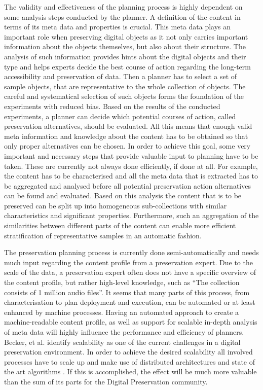 The validity and effectiveness of the planning process is highly dependent on some analysis steps conducted by the planner.
A definition of the content in terms of its meta data and properties is crucial.
This meta data plays an important role when preserving digital objects as it not only carries important information about the objects themselves, but also about their structure.
The analysis of such information provides hints about the digital objects and their type and helps experts decide the best course of action regarding the long-term accessibility and preservation of data.
Then a planner has to select a set of sample objects, that are representative to the whole collection of objects.
The careful and systematical selection of such objects forms the foundation of the experiments with reduced bias.
Based on the results of the conducted experiments, a planner can decide which potential courses of action, called preservation alternatives, should be evaluated.
All this means that enough valid meta information and knowledge about the content has to be obtained so that only proper alternatives can be chosen.
In order to achieve this goal, some very important and necessary steps that provide valuable input to planning have to be taken.
These are currently not always done efficiently, if done at all. 
For example, the content has to be characterised and all the meta data that is extracted has to be aggregated and analysed before all potential preservation action alternatives can be found and evaluated.
Based on this analysis the content that is to be preserved can be split up into homogeneous sub-collections with similar characteristics and significant properties.
Furthermore, such an aggregation of the similarities between different parts of the content can enable more efficient stratification of representative samples in an automatic fashion.

The preservation planning process is currently done semi-automatically and needs much input regarding the content profile from a preservation expert.
Due to the scale of the data, a preservation expert often does not have a specific overview of the content profile, but rather high-level knowledge, such as ``The collection consists of 1 million audio files''.
It seems that many parts of this process, from characterisation to plan deployment and execution, can be automated or at least enhanced by machine processes.
Having an automated approach to create a machine-readable content profile, as well as support for scalable in-depth analysis of meta data will highly influence the performance and efficiency of planners.
Becker, et al. identify scalability as one of the current challenges in a digital preservation environment. In order to achieve the desired scalability all involved processes have to scale up and make use of distributed architectures and state of the art algorithms \cite{Becker:2011:PDT:1998076.1998089}. If this is accomplished, the effect will be much more valuable than the sum of its parts for the Digital Preservation community.

